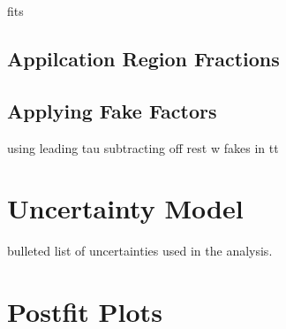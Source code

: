 fits

\subsection{Appilcation Region Fractions}


\subsection{Applying Fake Factors}

using leading tau
subtracting off rest
w fakes in tt

\section{Uncertainty Model}

bulleted list of uncertainties used in the analysis.

\section{Postfit Plots}

